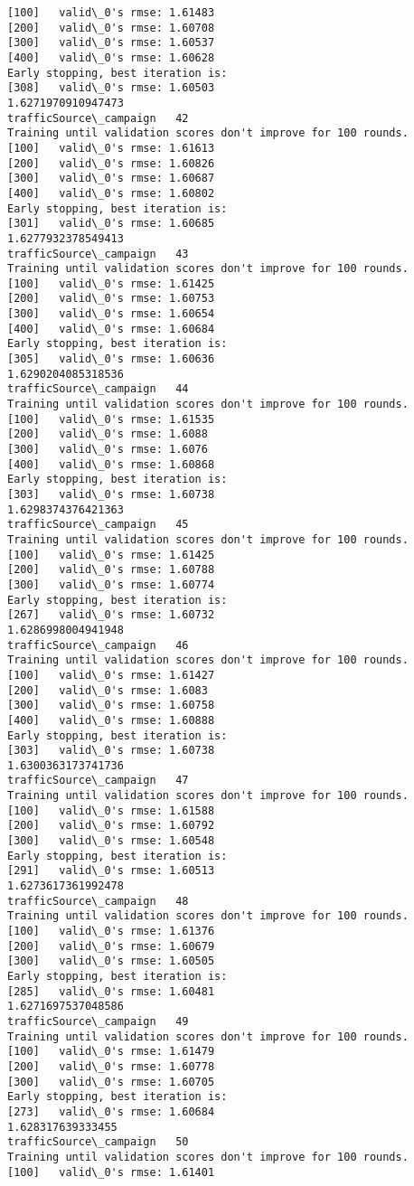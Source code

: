 \documentclass[11pt]{article}
\begin{document}
\begin{Verbatim}[commandchars=\\\{\}]
[100]	valid\_0's rmse: 1.61483
[200]	valid\_0's rmse: 1.60708
[300]	valid\_0's rmse: 1.60537
[400]	valid\_0's rmse: 1.60628
Early stopping, best iteration is:
[308]	valid\_0's rmse: 1.60503
1.6271970910947473
trafficSource\_campaign   42
Training until validation scores don't improve for 100 rounds.
[100]	valid\_0's rmse: 1.61613
[200]	valid\_0's rmse: 1.60826
[300]	valid\_0's rmse: 1.60687
[400]	valid\_0's rmse: 1.60802
Early stopping, best iteration is:
[301]	valid\_0's rmse: 1.60685
1.6277932378549413
trafficSource\_campaign   43
Training until validation scores don't improve for 100 rounds.
[100]	valid\_0's rmse: 1.61425
[200]	valid\_0's rmse: 1.60753
[300]	valid\_0's rmse: 1.60654
[400]	valid\_0's rmse: 1.60684
Early stopping, best iteration is:
[305]	valid\_0's rmse: 1.60636
1.6290204085318536
trafficSource\_campaign   44
Training until validation scores don't improve for 100 rounds.
[100]	valid\_0's rmse: 1.61535
[200]	valid\_0's rmse: 1.6088
[300]	valid\_0's rmse: 1.6076
[400]	valid\_0's rmse: 1.60868
Early stopping, best iteration is:
[303]	valid\_0's rmse: 1.60738
1.6298374376421363
trafficSource\_campaign   45
Training until validation scores don't improve for 100 rounds.
[100]	valid\_0's rmse: 1.61425
[200]	valid\_0's rmse: 1.60788
[300]	valid\_0's rmse: 1.60774
Early stopping, best iteration is:
[267]	valid\_0's rmse: 1.60732
1.6286998004941948
trafficSource\_campaign   46
Training until validation scores don't improve for 100 rounds.
[100]	valid\_0's rmse: 1.61427
[200]	valid\_0's rmse: 1.6083
[300]	valid\_0's rmse: 1.60758
[400]	valid\_0's rmse: 1.60888
Early stopping, best iteration is:
[303]	valid\_0's rmse: 1.60738
1.6300363173741736
trafficSource\_campaign   47
Training until validation scores don't improve for 100 rounds.
[100]	valid\_0's rmse: 1.61588
[200]	valid\_0's rmse: 1.60792
[300]	valid\_0's rmse: 1.60548
Early stopping, best iteration is:
[291]	valid\_0's rmse: 1.60513
1.6273617361992478
trafficSource\_campaign   48
Training until validation scores don't improve for 100 rounds.
[100]	valid\_0's rmse: 1.61376
[200]	valid\_0's rmse: 1.60679
[300]	valid\_0's rmse: 1.60505
Early stopping, best iteration is:
[285]	valid\_0's rmse: 1.60481
1.6271697537048586
trafficSource\_campaign   49
Training until validation scores don't improve for 100 rounds.
[100]	valid\_0's rmse: 1.61479
[200]	valid\_0's rmse: 1.60778
[300]	valid\_0's rmse: 1.60705
Early stopping, best iteration is:
[273]	valid\_0's rmse: 1.60684
1.628317639333455
trafficSource\_campaign   50
Training until validation scores don't improve for 100 rounds.
[100]	valid\_0's rmse: 1.61401

\end{Verbatim}
\end{document}
